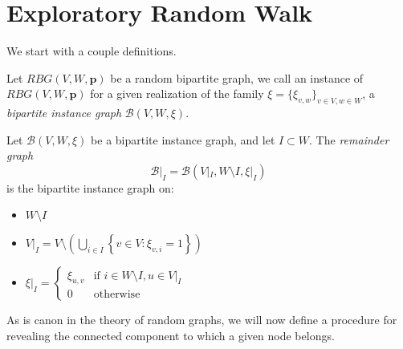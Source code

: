 \section{Exploratory Random Walk}\label{sec:erw}
We start with a couple definitions.
\begin{defn}\label{defn:big}
    Let $RBG(V,W,\mathbf{p})$ be a random bipartite graph, we call an instance of $RBG(V,W,\mathbf{p})$ for a given
    realization of the family $\xi = \{\xi_{v,w}\}_{v\in V, w\in W}$, a \emph{bipartite instance graph}
    $\mathcal{B}(V,W,\xi)$.
\end{defn}

\begin{defn}\label{defn:remainder}
    Let $\mathcal{B}(V,W,\xi)$ be a bipartite instance graph, and let $I \subset W$.
    The \emph{remainder graph} \[\mathcal{B}|_{I} = \mathcal{B}(V|_{I}, W\setminus I, \xi|_{I})\] is the bipartite instance graph on:
    \begin{itemize}
        \item $W\setminus I$
        \item $\displaystyle V|_{I} = V \setminus \left(\bigcup_{i\in I} \left\{v \in V\colon \xi_{v,i}=1 \right\}\right)$
        \item $\displaystyle \xi|_{I} = \left\{ \begin{array}{cc}
                                                    \xi_{u,v} & \textrm{if } i \in W\setminus I, u \in V|_{I}\\
                                                    0 & \textrm{otherwise}
        \end{array}\right.$
    \end{itemize}
\end{defn}

As is canon in the theory of random graphs\cite{bHofstad2017v1, bGrimmett2010, bAlonSpencer2008}, we will now define a
procedure for revealing the connected component to which a given node belongs.

